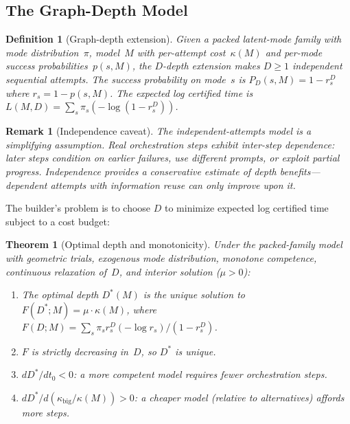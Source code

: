 \documentclass[twoside,11pt]{article}
\newtheorem{theorem}{Theorem}
\newtheorem{remark}{Remark}
\newtheorem{definition}{Definition}
\newcommand{\Dstar}{D^*}
\newcommand{\kappabig}{\kappa_{\mathrm{big}}}
\begin{document}
\subsection{The Graph-Depth Model}
\label{sec:graph-depth}

\begin{definition}[Graph-depth extension]
\label{def:graph-depth}
Given a packed latent-mode family with mode distribution~$\pi$, model~$M$ with per-attempt cost~$\kappa(M)$ and per-mode success probabilities~$p(s,M)$, the \emph{$D$-depth extension} makes $D \ge 1$ independent sequential attempts.
The success probability on mode~$s$ is $P_D(s,M) = 1 - r_s^D$ where $r_s = 1 - p(s,M)$.
The expected log certified time is $L(M, D) = \sum_s \pi_s (-\log(1 - r_s^D))$.
\end{definition}

\begin{remark}[Independence caveat]
\label{rem:independence}
The independent-attempts model is a simplifying assumption.
Real orchestration steps exhibit inter-step dependence: later steps condition on earlier failures, use different prompts, or exploit partial progress.
Independence provides a conservative estimate of depth benefits---dependent attempts with information reuse can only improve upon it.
\end{remark}

The builder's problem is to choose $D$ to minimize expected log certified time subject to a cost budget:

\begin{theorem}[Optimal depth and monotonicity]
\label{thm:optimal-depth}
Under the packed-family model with geometric trials, exogenous mode distribution, monotone competence, continuous relaxation of~$D$, and interior solution ($\mu > 0$):
\begin{enumerate}[label=(\alph*)]
  \item The optimal depth $\Dstar(M)$ is the unique solution to $F(\Dstar; M) = \mu \cdot \kappa(M)$, where $F(D; M) = \sum_s \pi_s r_s^D (-\log r_s) / (1 - r_s^D)$.
  \item $F$ is strictly decreasing in~$D$, so $\Dstar$ is unique.
  \item $d\Dstar / dt_0 < 0$: a more competent model requires fewer orchestration steps.
  \item $d\Dstar / d(\kappabig/\kappa(M)) > 0$: a cheaper model (relative to alternatives) affords more steps.
\end{enumerate}
\end{theorem}
\end{document}
